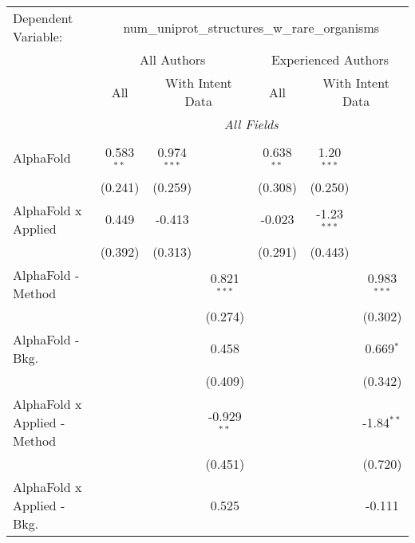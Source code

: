 \begingroup
\centering
\begin{tabular}{lcccccc}
   \tabularnewline \midrule \midrule
   Dependent Variable: & \multicolumn{6}{c}{num\_uniprot\_structures\_w\_rare\_organisms}\\
 & \multicolumn{3}{c}{All Authors} & \multicolumn{3}{c}{Experienced Authors} \\
\cmidrule(lr){2-4} \cmidrule(lr){5-7}
 & \multicolumn{1}{c}{All} & \multicolumn{2}{c}{With Intent Data} & \multicolumn{1}{c}{All} & \multicolumn{2}{c}{With Intent Data} \\
\cmidrule(lr){2-2} \cmidrule(lr){3-4} \cmidrule(lr){5-5} \cmidrule(lr){6-7}
 & \multicolumn{6}{c}{\textit{All Fields}} \\ \\
   AlphaFold                      & 0.583$^{**}$ & 0.974$^{***}$ &               & 0.638$^{**}$ & 1.20$^{***}$  &   \\   
                                  & (0.241)      & (0.259)       &               & (0.308)      & (0.250)       &   \\   
   AlphaFold x Applied            & 0.449        & -0.413        &               & -0.023       & -1.23$^{***}$ &   \\   
                                  & (0.392)      & (0.313)       &               & (0.291)      & (0.443)       &   \\   
   AlphaFold - Method             &              &               & 0.821$^{***}$ &              &               & 0.983$^{***}$\\   
                                  &              &               & (0.274)       &              &               & (0.302)\\   
   AlphaFold - Bkg.               &              &               & 0.458         &              &               & 0.669$^{*}$\\   
                                  &              &               & (0.409)       &              &               & (0.342)\\   
   AlphaFold x Applied - Method   &              &               & -0.929$^{**}$ &              &               & -1.84$^{**}$\\   
                                  &              &               & (0.451)       &              &               & (0.720)\\   
   AlphaFold x Applied - Bkg.     &              &               & 0.525         &              &               & -0.111\\   

\end{tabular}
